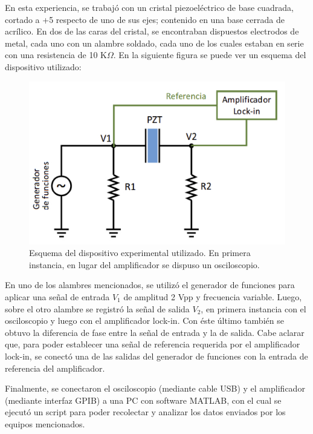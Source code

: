 \documentclass[twoside,twocolumn,a4paper]{article}
\begin{document}
En esta experiencia, se trabaj\'o con un cristal piezoel\'ectrico de base cuadrada, cortado a +5 \degree respecto de uno de sus ejes; contenido en una base cerrada de acr\'ilico. En dos de las caras del cristal, se encontraban dispuestos electrodos de metal, cada uno con un alambre soldado, cada uno de los cuales estaban en serie con una resistencia de 10 K$\Omega$. En la siguiente figura se puede ver un esquema del dispositivo utilizado:

\begin{figure}[H]
\includegraphics[width=\linewidth]{dispexp.jpg}
\caption{Esquema del dispositivo experimental utilizado. En primera instancia, en lugar del amplificador se dispuso un osciloscopio.}
\label{fig:dispexp}
\end{figure}

En uno de los alambres mencionados, se utiliz\'o el generador de funciones para aplicar una se\~nal de entrada $V_{1}$ de amplitud 2 Vpp y frecuencia variable. Luego, sobre el otro alambre se registr\'o la se\~nal de salida $V_{2}$, en primera instancia con el osciloscopio y luego con el amplificador lock-in. Con \'este \'ultimo tambi\'en se obtuvo la diferencia de fase entre la se\~nal de entrada y la de salida. Cabe aclarar que, para poder establecer una se\~nal de referencia requerida por el amplificador lock-in, se conect\'o una de las salidas del generador de funciones con la entrada de referencia del amplificador.


Finalmente, se conectaron el osciloscopio (mediante cable USB) y el amplificador (mediante interfaz GPIB) a una PC con software MATLAB,    con el cual se ejecut\'o un script para poder recolectar y analizar los datos enviados por los equipos mencionados.
\end{document}
